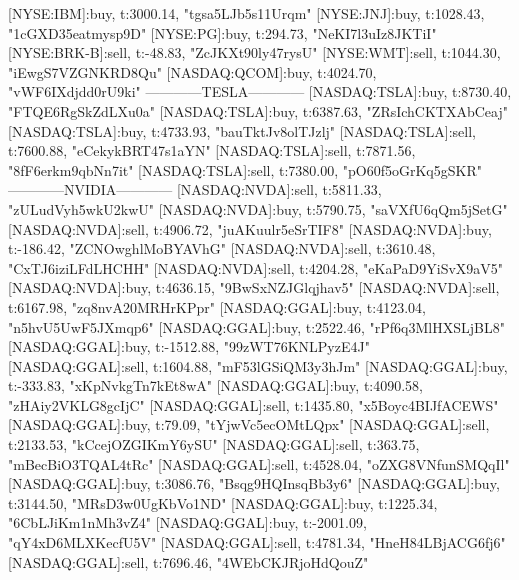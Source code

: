 \documentclass[a4paper]{article}
\begin{document}
[NYSE:IBM]:buy, t:3000.14, "tgsa5LJb5s11Urqm"
[NYSE:JNJ]:buy, t:1028.43, "1cGXD35eatmysp9D"
[NYSE:PG]:buy, t:294.73, "NeKI7l3uIz8JKTiI"
[NYSE:BRK-B]:sell, t:-48.83, "ZcJKXt90ly47rysU"
[NYSE:WMT]:sell, t:1044.30, "iEwgS7VZGNKRD8Qu"
[NASDAQ:QCOM]:buy, t:4024.70, "vWF6IXdjdd0rU9ki"
------------TESLA------------
[NASDAQ:TSLA]:buy, t:8730.40, "FTQE6RgSkZdLXu0a"
[NASDAQ:TSLA]:buy, t:6387.63, "ZRsIchCKTXAbCeaj"
[NASDAQ:TSLA]:buy, t:4733.93, "bauTktJv8olTJzlj"
[NASDAQ:TSLA]:sell, t:7600.88, "eCekykBRT47s1aYN"
[NASDAQ:TSLA]:sell, t:7871.56, "8fF6erkm9qbNn7it"
[NASDAQ:TSLA]:sell, t:7380.00, "pO60f5oGrKq5gSKR"
------------NVIDIA------------
[NASDAQ:NVDA]:sell, t:5811.33, "zULudVyh5wkU2kwU"
[NASDAQ:NVDA]:buy, t:5790.75, "saVXfU6qQm5jSetG"
[NASDAQ:NVDA]:sell, t:4906.72, "juAKuulr5eSrTIF8"
[NASDAQ:NVDA]:buy, t:-186.42, "ZCNOwghlMoBYAVhG"
[NASDAQ:NVDA]:sell, t:3610.48, "CxTJ6iziLFdLHCHH"
[NASDAQ:NVDA]:sell, t:4204.28, "eKaPaD9YiSvX9aV5"
[NASDAQ:NVDA]:buy, t:4636.15, "9BwSxNZJGlqjhav5"
[NASDAQ:NVDA]:sell, t:6167.98, "zq8nvA20MRHrKPpr"
[NASDAQ:GGAL]:buy, t:4123.04, "n5hvU5UwF5JXmqp6"
[NASDAQ:GGAL]:buy, t:2522.46, "rPf6q3MlHXSLjBL8"
[NASDAQ:GGAL]:buy, t:-1512.88, "99zWT76KNLPyzE4J"
[NASDAQ:GGAL]:sell, t:1604.88, "mF53lGSiQM3y3hJm"
[NASDAQ:GGAL]:buy, t:-333.83, "xKpNvkgTn7kEt8wA"
[NASDAQ:GGAL]:buy, t:4090.58, "zHAiy2VKLG8gcIjC"
[NASDAQ:GGAL]:sell, t:1435.80, "x5Boyc4BIJfACEWS"
[NASDAQ:GGAL]:buy, t:79.09, "tYjwVc5ecOMtLQpx"
[NASDAQ:GGAL]:sell, t:2133.53, "kCcejOZGIKmY6ySU"
[NASDAQ:GGAL]:sell, t:363.75, "mBecBiO3TQAL4tRc"
[NASDAQ:GGAL]:sell, t:4528.04, "oZXG8VNfunSMQqIl"
[NASDAQ:GGAL]:buy, t:3086.76, "Bsqg9HQInsqBb3y6"
[NASDAQ:GGAL]:buy, t:3144.50, "MRsD3w0UgKbVo1ND"
[NASDAQ:GGAL]:buy, t:1225.34, "6CbLJiKm1nMh3vZ4"
[NASDAQ:GGAL]:buy, t:-2001.09, "qY4xD6MLXKecfU5V"
[NASDAQ:GGAL]:sell, t:4781.34, "HneH84LBjACG6fj6"
[NASDAQ:GGAL]:sell, t:7696.46, "4WEbCKJRjoHdQouZ"
\end{document}
